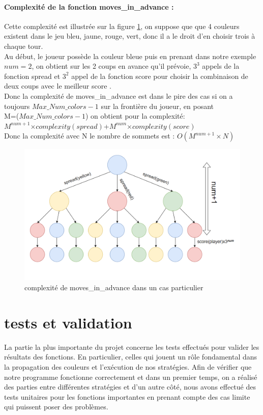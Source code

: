 \documentclass[11pt]{article}
\begin{document}
\paragraph{Complexité de la fonction moves\_in\_advance : \\}
Cette complexité est illustrée sur la figure \ref{fig:7}, on suppose que que 4 couleurs existent dans le jeu {bleu, jaune, rouge, vert}, donc il a le droit d'en choisir trois à chaque tour.\\
Au début, le joueur possède la couleur bleue puis en prenant dans notre exemple $num=2$, on obtient sur les 2 coups en avance qu'il prévoie,  $3^3$ appels de la fonction spread et $3^2$ appel de la fonction score pour choisir la combinaison de deux coups avec le meilleur score .\\
Donc la complexité de moves\_in\_advance est dans le pire des cas si on a toujours $Max\_Num\_colors-1$ sur la frontière du joueur, en posant\\ M=($Max\_Num\_colors-1$) on obtient pour la complexité:\\ $M^{num+1}$$\times$$complexity(spread)$+$M^{num}$$\times$$complexity(score)$
\\
Donc la complexité avec N le nombre de sommets est : $O(M^{num+1}\times{N})$

\begin{figure}[h!]
\includegraphics[scale=0.6]{./img/move_in_advance.png}
\caption{complexité de moves\_in\_advance dans un cas particulier}
\label{fig:7}
\end{figure}
\newpage

\section{tests et validation}
La partie la plus importante du projet concerne les tests effectués pour valider les résultats des fonctions. En particulier, celles qui jouent un rôle fondamental dans la propagation des couleurs et l'exécution de nos stratégies. Afin de vérifier que notre programme fonctionne correctement et dans un premier temps, on a réalisé des parties entre différentes stratégies et d'un autre côté, nous avons effectué des tests unitaires pour les fonctions importantes en prenant compte des cas limite qui puissent poser des problèmes.
\end{document}
